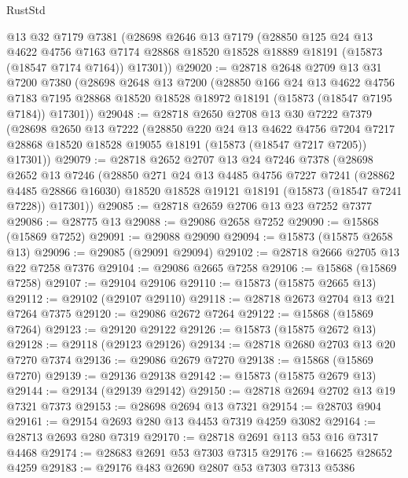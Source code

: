 \begin{lexlean}{RustStd}
\begin{coremodule}
    @13
    @32
    @7179
    @7381
    (@28698
      @2646
      @13
      @7179
      (@28850
        @125
        @24
        @13
        @4622
        @4756
        @7163
        @7174
        @28868
        @18520
        @18528
        @18889
        @18191
        (@15873 (@18547 @7174 @7164))
        @17301))
@29020 := @28718
    @2648
    @2709
    @13
    @31
    @7200
    @7380
    (@28698
      @2648
      @13
      @7200
      (@28850
        @166
        @24
        @13
        @4622
        @4756
        @7183
        @7195
        @28868
        @18520
        @18528
        @18972
        @18191
        (@15873 (@18547 @7195 @7184))
        @17301))
@29048 := @28718
    @2650
    @2708
    @13
    @30
    @7222
    @7379
    (@28698
      @2650
      @13
      @7222
      (@28850
        @220
        @24
        @13
        @4622
        @4756
        @7204
        @7217
        @28868
        @18520
        @18528
        @19055
        @18191
        (@15873 (@18547 @7217 @7205))
        @17301))
@29079 := @28718
    @2652
    @2707
    @13
    @24
    @7246
    @7378
    (@28698
      @2652
      @13
      @7246
      (@28850
        @271
        @24
        @13
        @4485
        @4756
        @7227
        @7241
        (@28862 @4485 @28866 @16030)
        @18520
        @18528
        @19121
        @18191
        (@15873 (@18547 @7241 @7228))
        @17301))
@29085 := @28718 @2659 @2706 @13 @23 @7252 @7377
@29086 := @28775 @13
@29088 := @29086 @2658 @7252
@29090 := @15868 (@15869 @7252)
@29091 := @29088 @29090
@29094 := @15873 (@15875 @2658 @13)
@29096 := @29085 (@29091 @29094)
@29102 := @28718 @2666 @2705 @13 @22 @7258 @7376
@29104 := @29086 @2665 @7258
@29106 := @15868 (@15869 @7258)
@29107 := @29104 @29106
@29110 := @15873 (@15875 @2665 @13)
@29112 := @29102 (@29107 @29110)
@29118 := @28718 @2673 @2704 @13 @21 @7264 @7375
@29120 := @29086 @2672 @7264
@29122 := @15868 (@15869 @7264)
@29123 := @29120 @29122
@29126 := @15873 (@15875 @2672 @13)
@29128 := @29118 (@29123 @29126)
@29134 := @28718 @2680 @2703 @13 @20 @7270 @7374
@29136 := @29086 @2679 @7270
@29138 := @15868 (@15869 @7270)
@29139 := @29136 @29138
@29142 := @15873 (@15875 @2679 @13)
@29144 := @29134 (@29139 @29142)
@29150 := @28718 @2694 @2702 @13 @19 @7321 @7373
@29153 := @28698 @2694 @13 @7321
@29154 := @28703 @904
@29161 := @29154 @2693 @280 @13 @4453 @7319 @4259 @3082
@29164 := @28713 @2693 @280 @7319
@29170 := @28718 @2691 @113 @53 @16 @7317 @4468
@29174 := @28683 @2691 @53 @7303 @7315
@29176 := @16625 @28652 @4259
@29183 := @29176 @483 @2690 @2807 @53 @7303 @7313 @5386

\end{coremodule}
\end{lexlean}

